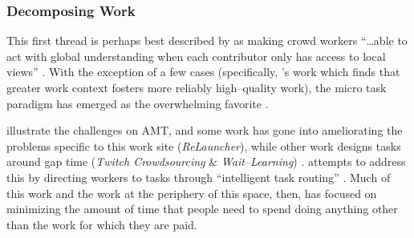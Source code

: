 \documentclass[trackingWork]{subfiles}
\begin{document}
\subsubsection[How far can work be decomposed into smaller and smaller microtasks]{Decomposing Work}\label{sec:decomposition}

\subsubsubsection{\crowdworkpers}
This first thread is
perhaps best described by \citeauthor{verroios2014context} as
making crowd workers ``\dots able to act with
global understanding when each contributor only has access to local views''
\cite{verroios2014context}.
With the exception of a few cases
(specifically, \citeauthor{Kinnaird:2012:WTM:2389176.2389219}'s work
which finds that greater work context fosters more reliably high--quality work),
the micro task paradigm has emerged as the overwhelming favorite
\cite{selfsourcingTeevan2014,selfsourcingTeevan2016,
      cheng2015break,Kinnaird:2012:WTM:2389176.2389219}.


\citeauthor{taskSearch} illustrate the challenges on AMT,
and some work has gone into ameliorating the problems specific to this work site
(\textit{ReLauncher}), %
while other work designs tasks around gap time
(\textit{Twitch Crowdsourcing} \& \textit{Wait--Learning})
\cite{taskSearch,KucherbaevReLauncher,Vaish:2014:TCC:2611222.2556996,
      Cai:2015:WLW:2702123.2702267}.
\citeauthor{Cosley:2007:SUI:1216295.1216309}
attempts to address this by
directing workers to tasks through
``intelligent task routing''
\cite{Cosley:2007:SUI:1216295.1216309}.
Much of this work and the work at the periphery of this space, then,
has focused on
minimizing the amount of time that people need to spend doing
anything other than the work for which they are paid.
\end{document}

